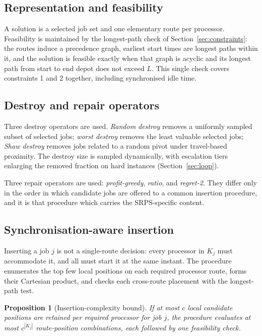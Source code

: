 \documentclass[11pt,a4paper]{article}
\newcommand{\Kj}{\ensuremath{K_j}}
\newtheorem{proposition}{Proposition}
\begin{document}
\subsection{Representation and feasibility}\label{sec:representation}

A solution is a selected job set and one elementary route per processor.
Feasibility is maintained by the longest-path check of
Section~\ref{sec:constraints}: the routes induce a precedence graph, earliest
start times are longest paths within it, and the solution is feasible exactly when
that graph is acyclic and its longest path from start to end depot does not exceed
$L$. This single check covers constraints 1 and 2 together, including synchronised
idle time.

\subsection{Destroy and repair operators}

Three destroy operators are used. \emph{Random destroy} removes a uniformly
sampled subset of selected jobs; \emph{worst destroy} removes the least valuable
selected jobs; \emph{Shaw destroy} removes jobs related to a random pivot under
travel-based proximity. The destroy size is sampled dynamically, with escalation
tiers enlarging the removed fraction on hard instances (Section~\ref{sec:loop}).

Three repair operators are used: \emph{profit-greedy}, \emph{ratio}, and
\emph{regret-2}. They differ only in the order in which candidate jobs are offered
to a common insertion procedure, and it is that procedure which carries the
SRPS-specific content.

\subsection{Synchronisation-aware insertion}

Inserting a job $j$ is not a single-route decision: every processor in $\Kj$ must
accommodate it, and all must start it at the same instant. The procedure
enumerates the top few local positions on each required processor route, forms
their Cartesian product, and checks each cross-route placement with the
longest-path test.

\begin{proposition}[Insertion-complexity bound]
If at most $c$ local candidate positions are retained per required processor for
job $j$, the procedure evaluates at most $c^{|\Kj|}$ route-position combinations,
each followed by one feasibility check.
\end{proposition}
\end{document}
